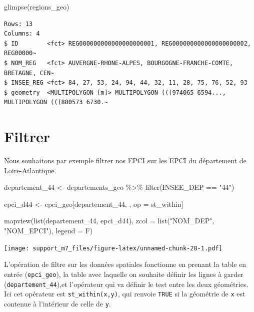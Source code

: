 \documentclass[
]{book}
\newenvironment{Shaded}{\begin{snugshade}}{\end{snugshade}}
\newcommand{\AttributeTok}[1]{\textcolor[rgb]{0.77,0.63,0.00}{#1}}
\newcommand{\FunctionTok}[1]{\textcolor[rgb]{0.00,0.00,0.00}{#1}}
\newcommand{\NormalTok}[1]{#1}
\newcommand{\OtherTok}[1]{\textcolor[rgb]{0.56,0.35,0.01}{#1}}
\newcommand{\SpecialCharTok}[1]{\textcolor[rgb]{0.00,0.00,0.00}{#1}}
\newcommand{\StringTok}[1]{\textcolor[rgb]{0.31,0.60,0.02}{#1}}
\begin{document}
\begin{Shaded}
\begin{Highlighting}[]
\FunctionTok{glimpse}\NormalTok{(regions\_geo)}
\end{Highlighting}
\end{Shaded}

\begin{verbatim}
Rows: 13
Columns: 4
$ ID        <fct> REG000000000000000000001, REG000000000000000000002, REG00000~
$ NOM_REG   <fct> AUVERGNE-RHONE-ALPES, BOURGOGNE-FRANCHE-COMTE, BRETAGNE, CEN~
$ INSEE_REG <fct> 84, 27, 53, 24, 94, 44, 32, 11, 28, 75, 76, 52, 93
$ geometry  <MULTIPOLYGON [m]> MULTIPOLYGON (((974065 6594..., MULTIPOLYGON (((880573 6730.~
\end{verbatim}

\hypertarget{filtrer}{%
\section{Filtrer}\label{filtrer}}

Nous souhaitons par exemple filtrer nos EPCI sur les EPCI du département de Loire-Atlantique.

\begin{Shaded}
\begin{Highlighting}[]
\NormalTok{departement\_44 }\OtherTok{\textless{}{-}}\NormalTok{ departements\_geo }\SpecialCharTok{\%\textgreater{}\%}
  \FunctionTok{filter}\NormalTok{(INSEE\_DEP }\SpecialCharTok{==} \StringTok{"44"}\NormalTok{)}

\NormalTok{epci\_d44 }\OtherTok{\textless{}{-}}\NormalTok{ epci\_geo[departement\_44, , op }\OtherTok{=}\NormalTok{ st\_within]}

\FunctionTok{mapview}\NormalTok{(}\FunctionTok{list}\NormalTok{(departement\_44, epci\_d44), }\AttributeTok{zcol =} \FunctionTok{list}\NormalTok{(}\StringTok{"NOM\_DEP"}\NormalTok{, }\StringTok{"NOM\_EPCI"}\NormalTok{), }\AttributeTok{legend =}\NormalTok{ F)}
\end{Highlighting}
\end{Shaded}

\texttt{[image: support\_m7\_files/figure-latex/unnamed-chunk-28-1.pdf]}

L'opération de filtre sur les données spatiales fonctionne en prenant la table en entrée (\texttt{epci\_geo}), la table avec laquelle on souhaite définir les lignes à garder (\texttt{departement\_44}),et l'opérateur qui va définir le test entre les deux géométries. Ici cet opérateur est \texttt{st\_within(x,y)}, qui renvoie \texttt{TRUE} si la géométrie de \texttt{x} est contenue à l'intérieur de celle de \texttt{y}.
\end{document}
